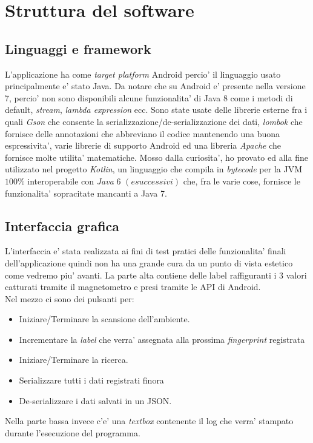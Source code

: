 \chapter{Struttura del software}

\section{Linguaggi e framework}
L'applicazione ha come \textit{target platform} Android percio' il linguaggio usato principalmente e' stato Java. Da notare che su Android e' presente nella versione 7, percio' non sono disponibili alcune funzionalita' di Java 8 come i metodi di default, \textit{stream}, \textit{lambda expression} ecc. Sono state usate delle librerie esterne fra i quali \textit{Gson} che consente la serializzazione/de-serializzazione dei dati, \textit{lombok} che fornisce delle annotazioni che abbreviano il codice mantenendo una buona espressivita', varie librerie di supporto Android ed una libreria \textit{Apache} che fornisce molte utilita' matematiche. Mosso dalla curiosita', ho provato ed alla fine utilizzato nel progetto \textit{Kotlin}, un linguaggio che compila in \textit{bytecode} per la JVM $100 \%$ interoperabile con \textit{Java} 6 $(e successivi)$ che, fra le varie cose, fornisce le funzionalita' sopracitate mancanti a Java 7.

\section{Interfaccia grafica}
L'interfaccia e' stata realizzata ai fini di test pratici delle funzionalita' finali dell'applicazione quindi non ha una grande cura da un punto di vista estetico come vedremo piu' avanti.
La parte alta contiene delle label raffiguranti i 3 valori catturati tramite il magnetometro e presi tramite le API di Android. \\
Nel mezzo ci sono dei pulsanti per:
\begin{itemize}
	\item Iniziare/Terminare la scansione dell'ambiente.
	\item Incrementare la \textit{label} che verra' assegnata alla prossima \textit{fingerprint} registrata
	\item Iniziare/Terminare la ricerca.
	\item Serializzare tutti i dati registrati finora
	\item De-serializzare i dati salvati in un JSON.
\end{itemize}
Nella parte bassa invece c'e' una \textit{textbox} contenente il log che verra' stampato durante l'esecuzione del programma.

